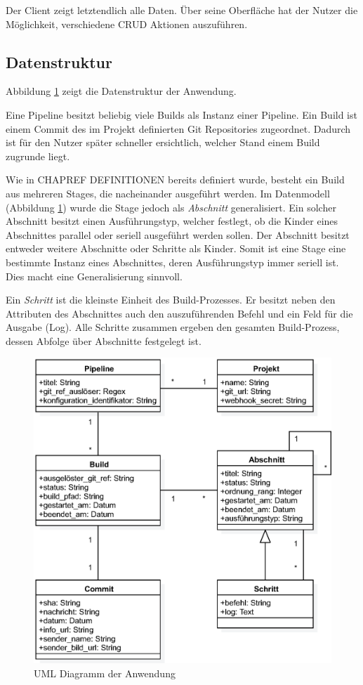 Der Client zeigt letztendlich alle Daten. Über seine Oberfläche hat der Nutzer die Möglichkeit, verschiedene \ac{CRUD} Aktionen auszuführen.

\subsection{Datenstruktur}

Abbildung \ref{fig:uml} zeigt die Datenstruktur der Anwendung.

Eine Pipeline besitzt beliebig viele Builds als Instanz einer Pipeline. Ein Build ist einem Commit des im Projekt definierten Git Repositories zugeordnet. Dadurch ist für den Nutzer später schneller ersichtlich, welcher Stand einem Build zugrunde liegt.

Wie in CHAPREF DEFINITIONEN bereits definiert wurde, besteht ein Build aus mehreren Stages, die nacheinander ausgeführt werden. Im Datenmodell (Abbildung \ref{fig:uml}) wurde die Stage jedoch als \emph{Abschnitt} generalisiert. Ein solcher Abschnitt besitzt einen Ausführungstyp, welcher festlegt, ob die Kinder eines Abschnittes parallel oder seriell ausgeführt werden sollen. Der Abschnitt besitzt entweder weitere Abschnitte oder Schritte als Kinder. Somit ist eine Stage eine bestimmte Instanz eines Abschnittes, deren Ausführungstyp immer seriell ist. Dies macht eine Generalisierung sinnvoll.

Ein \emph{Schritt} ist die kleinste Einheit des Build-Prozesses. Er besitzt neben den Attributen des Abschnittes auch den auszuführenden Befehl und ein Feld für die Ausgabe (Log). Alle Schritte zusammen ergeben den gesamten Build-Prozess, dessen Abfolge über Abschnitte festgelegt ist.

\begin{figure}[h]
  \caption{UML Diagramm der Anwendung}
  \label{fig:uml}
  \centering
    \includegraphics[width=\textwidth]{assets/uml}
\end{figure}


